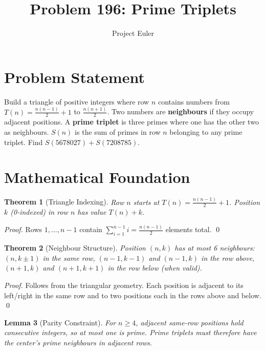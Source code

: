 \documentclass[12pt]{article}
\title{Problem 196: Prime Triplets}
\author{Project Euler}
\date{}
\newtheorem{theorem}{Theorem}
\newtheorem{lemma}[theorem]{Lemma}
\begin{document}
\maketitle

\section{Problem Statement}

Build a triangle of positive integers where row $n$ contains numbers from $T(n) = \frac{n(n-1)}{2}+1$ to $\frac{n(n+1)}{2}$. Two numbers are \textbf{neighbours} if they occupy adjacent positions. A \textbf{prime triplet} is three primes where one has the other two as neighbours. $S(n)$ is the sum of primes in row $n$ belonging to any prime triplet. Find $S(5678027) + S(7208785)$.

\section{Mathematical Foundation}

\begin{theorem}[Triangle Indexing]
Row $n$ starts at $T(n) = \frac{n(n-1)}{2} + 1$. Position $k$ (0-indexed) in row $n$ has value $T(n) + k$.
\end{theorem}

\begin{proof}
Rows $1, \ldots, n-1$ contain $\sum_{i=1}^{n-1} i = \frac{n(n-1)}{2}$ elements total. \qed
\end{proof}

\begin{theorem}[Neighbour Structure]
Position $(n, k)$ has at most 6 neighbours: $(n, k \pm 1)$ in the same row, $(n-1, k-1)$ and $(n-1, k)$ in the row above, $(n+1, k)$ and $(n+1, k+1)$ in the row below (when valid).
\end{theorem}

\begin{proof}
Follows from the triangular geometry. Each position is adjacent to its left/right in the same row and to two positions each in the rows above and below. \qed
\end{proof}

\begin{lemma}[Parity Constraint]
For $n \geq 4$, adjacent same-row positions hold consecutive integers, so at most one is prime. Prime triplets must therefore have the center's prime neighbours in adjacent rows.
\end{lemma}
\end{document}
